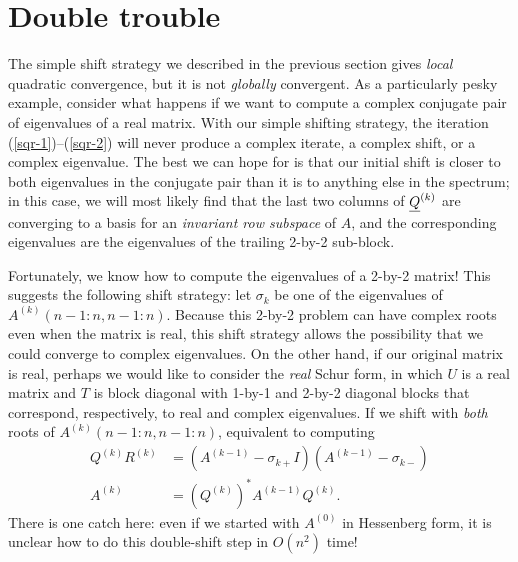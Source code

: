 \section{Double trouble}

The simple shift strategy we described in the previous section gives
{\em local} quadratic convergence, but it is not {\em globally} convergent.
%
As a particularly pesky example, consider what happens if we
want to compute a complex conjugate pair of eigenvalues of a real
matrix.  With our simple shifting strategy, the iteration
(\ref{sqr-1})--(\ref{sqr-2}) will never produce a complex iterate, a
complex shift, or a complex eigenvalue.  The best we can hope for is
that our initial shift is closer to both eigenvalues in the conjugate
pair than it is to anything else in the spectrum; in this case, we
will most likely find that the last two columns of $\underline{Q}^{(k)}$ are
converging to a basis for an {\em invariant row subspace} of $A$,
and the corresponding eigenvalues are the eigenvalues of the trailing
2-by-2 sub-block.

Fortunately, we know how to compute the eigenvalues of a 2-by-2
matrix!  This suggests the following shift strategy: let $\sigma_k$ be
one of the eigenvalues of $A^{(k)}(n-1:n,n-1:n)$.  Because this 2-by-2
problem can have complex roots even when the matrix is real, this
shift strategy allows the possibility that we could converge to
complex eigenvalues. On the other hand, if our original matrix is
real, perhaps we would like to consider the {\em real} Schur form, in
which $U$ is a real matrix and $T$ is block diagonal with 1-by-1 and
2-by-2 diagonal blocks that correspond, respectively, to real and
complex eigenvalues.  If we shift with {\em both} roots of
$A^{(k)}(n-1:n,n-1:n)$, equivalent to computing
\begin{align*}
  Q^{(k)} R^{(k)} &= (A^{(k-1)} - \sigma_{k+} I)(A^{(k-1)} - \sigma_{k-}) \\
  A^{(k)} &= (Q^{(k)})^* A^{(k-1)} Q^{(k)}. \label{sqr-2}
\end{align*}
There is one catch here: even if we started with $A^{(0)}$ in Hessenberg
form, it is unclear how to do this double-shift step in $O(n^2)$ time!

